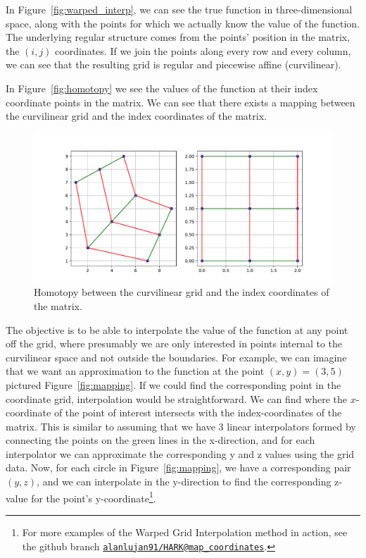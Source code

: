 \documentclass[\econtexRoot/SequentialEGM]{subfiles}
\begin{document}
In Figure~\ref{fig:warped_interp}, we can see the true function in three-dimensional space, along with the points for which we actually know the value of the function. The underlying regular structure comes from the points' position in the matrix, the $(i,j)$ coordinates. If we join the points along every row and every column, we can see that the resulting grid is regular and piecewise affine (curvilinear).

In Figure~\ref{fig:homotopy} we see the values of the function at their index coordinate points in the matrix. We can see that there exists a mapping between the curvilinear grid and the index coordinates of the matrix.

\begin{figure}
    \centering
    \includegraphics[width=0.8\linewidth]{Figures/Homotopy.pdf}
    \caption{Homotopy between the curvilinear grid and the index coordinates of the matrix.}
    \notinsubfile{\label{fig:homotopy}}
\end{figure}

The objective is to be able to interpolate the value of the function at any point off the grid, where presumably we are only interested in points internal to the curvilinear space and not outside the boundaries. For example, we can imagine that we want an approximation to the function at the point $(x,y) = (3, 5)$ pictured Figure~\ref{fig:mapping}. If we could find the corresponding point in the coordinate grid, interpolation would be straightforward. We can find where the $x$-coordinate of the point of interest intersects with the index-coordinates of the matrix. This is similar to assuming that we have 3 linear interpolators formed by connecting the points on the green lines in the x-direction, and for each interpolator we can approximate the corresponding y and z values using the grid data. Now, for each circle in Figure~\ref{fig:mapping}, we have a corresponding pair $(y,z)$, and we can interpolate in the y-direction to find the corresponding z-value for the point's y-coordinate\footnote{For more examples of the Warped Grid Interpolation method in action, see the github branch \href{https://github.com/alanlujan91/HARK/blob/map\_coordinates/examples/Interpolation/CurvilinearInterpolation.ipynb}{\texttt{alanlujan91/HARK@map\_coordinates}}.}.
\end{document}
